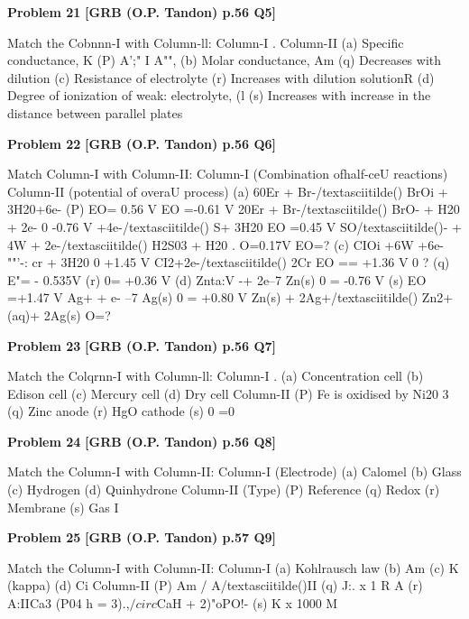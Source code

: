 \begin{problembox}
\textbf{Problem 21} \hfill \textbf{[GRB (O.P. Tandon) p.56 Q5]}
\label{q:ext-grb_all_questions-21}

Match the Cobnnn-I with Column-ll: 
Column-I . 
Column-II 
(a) Specific conductance, K 
(P) A';" I A"", 
(b) Molar conductance, Am 
(q) Decreases with dilution 
(c) Resistance of electrolyte (r) Increases with dilution 
solutionR 
(d) Degree of ionization of 
weak: electrolyte, (l 
(s) Increases with increase in 
the distance between 
parallel plates
\end{problembox}

\begin{problembox}
\textbf{Problem 22} \hfill \textbf{[GRB (O.P. Tandon) p.56 Q6]}
\label{q:ext-grb_all_questions-22}

Match Column-I with Column-II: 
Column-I 
(Combination ofhalf-ceU reactions) 
Column-II 
(potential of 
overaU 
process) 
(a) 60Er + Br-/textasciitilde() BrOi + 3H20+6e-
(P) EO= 0.56 V 
EO =-0.61 V 
20Er + Br-/textasciitilde() BrO- + H20 + 2e-
 0 -0.76 V 
+4e-/textasciitilde() S+ 3H20 
EO =0.45 V 
SO/textasciitilde()- + 4W + 2e-/textasciitilde() H2S03 + H20 
.  O=0.17V 
EO=? 
(c) CIOi +6W +6e-""'-: cr + 3H20 
 0 
+1.45 V 
CI2+2e-/textasciitilde() 2Cr 
EO == +1.36 V 
 0 ? 
(q) E"= - 0.535V 
(r)  0= +0.36 V 
(d) Znta:V -+ 2e--7 Zn(s)  0 = -0.76 V (s) EO =+1.47 V 
Ag+ + e- --7 Ag(s)  0 = +0.80 V 
Zn(s) + 2Ag+/textasciitilde() Zn2+ (aq)+ 2Ag(s) 
 O=?
\end{problembox}

\begin{problembox}
\textbf{Problem 23} \hfill \textbf{[GRB (O.P. Tandon) p.56 Q7]}
\label{q:ext-grb_all_questions-23}

Match the Colqrnn-I with Column-ll: 
Column-I 
. (a) Concentration cell 
(b) Edison cell 
(c) Mercury cell 
(d) Dry cell 
Column-II 
(P) Fe is oxidised by Ni20 3 
(q) Zinc anode 
(r) HgO cathode 
(s)  0 =0
\end{problembox}

\begin{problembox}
\textbf{Problem 24} \hfill \textbf{[GRB (O.P. Tandon) p.56 Q8]}
\label{q:ext-grb_all_questions-24}

Match the Column-I with Column-II: 
Column-I (Electrode) 
(a) Calomel 
(b) Glass 
(c) Hydrogen 
(d) Quinhydrone 
Column-II (Type) 
(P) Reference 
(q) Redox 
(r) Membrane 
(s) Gas 
I
\end{problembox}

\begin{problembox}
\textbf{Problem 25} \hfill \textbf{[GRB (O.P. Tandon) p.57 Q9]}
\label{q:ext-grb_all_questions-25}

Match the Column-I with Column-II: 
Column-I 
(a) Kohlrausch law 
(b) Am 
(c) K (kappa) 
(d) Ci 
Column-II 
(P) Am / A/textasciitilde()II 
(q) J:. x 1 
R A 
(r) A:IICa3 (P04 h 
= 3).,$/circ$CaH + 2)"oPO!-
(s) K x 1000 
M
\end{problembox}


